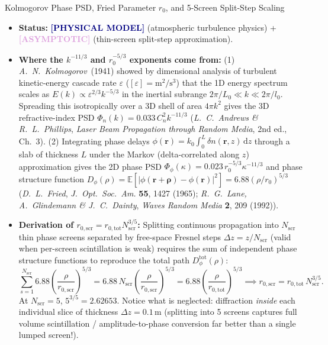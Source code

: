 \documentclass[10pt,letterpaper]{article}
\newcommand{\abs}[1]{\lvert #1 \rvert}
\newcommand{\dd}{\mathrm{d}}
\newcommand{\tagmodel}{\textcolor{navy}{\textbf{[PHYSICAL MODEL]}}}
\newcommand{\tagasymp}{\textcolor{plum}{\textbf{[ASYMPTOTIC]}}}
\numberwithin{equation}{section}
\begin{document}
\begin{approxbox}{Kolmogorov Phase PSD, Fried Parameter $r_0$, and 5-Screen Split-Step Scaling}
\begin{itemize}[leftmargin=1.4em,itemsep=2pt,topsep=1pt]
  \item \textbf{Status:} \tagmodel{} (atmospheric turbulence physics) + \tagasymp{} (thin-screen split-step approximation).
  \item \textbf{Where the $k^{-11/3}$ and $r_0^{-5/3}$ exponents come from:}
    (1) \emph{A.\ N.\ Kolmogorov}~(1941) showed by dimensional analysis of turbulent kinetic-energy cascade rate $\varepsilon$ ($[\varepsilon] = \mathrm{m}^2/\mathrm{s}^3$) that the 1D energy spectrum scales as $E(k) \propto \varepsilon^{2/3} k^{-5/3}$ in the inertial subrange $2\pi/L_0 \ll k \ll 2\pi/l_0$. Spreading this isotropically over a 3D shell of area $4\pi k^2$ gives the 3D refractive-index PSD $\Phi_n(k) = 0.033\,C_n^2 k^{-11/3}$ (\emph{L.\ C.\ Andrews \& R.\ L.\ Phillips}, \emph{Laser Beam Propagation through Random Media}, 2nd ed., Ch.~3).
    (2) Integrating phase delays $\phi(\mathbf{r}) = k_0 \int_0^L \delta n(\mathbf{r},z)\,\dd z$ through a slab of thickness $L$ under the Markov (delta-correlated along $z$) approximation gives the 2D phase PSD $\Phi_\phi(\kappa) = 0.023\,r_0^{-5/3}\kappa^{-11/3}$ and phase structure function $D_\phi(\rho) = \mathbb{E}[\abs{\phi(\mathbf{r}+\boldsymbol{\rho})-\phi(\mathbf{r})}^2] = 6.88(\rho/r_0)^{5/3}$ (\emph{D.\ L.\ Fried}, \emph{J.\ Opt.\ Soc.\ Am.} \textbf{55}, 1427 (1965); \emph{R.\ G.\ Lane, A.\ Glindemann \& J.\ C.\ Dainty}, \emph{Waves Random Media} \textbf{2}, 209 (1992)).
  \item \textbf{Derivation of $r_{0,\mathrm{scr}} = r_{0,\mathrm{tot}} N_{\mathrm{scr}}^{3/5}$:} Splitting continuous propagation into $N_{\mathrm{scr}}$ thin phase screens separated by free-space Fresnel steps $\Delta z = z/N_{\mathrm{scr}}$ (valid when per-screen scintillation is weak) requires the sum of independent phase structure functions to reproduce the total path $D_\phi^{\mathrm{tot}}(\rho)$:
  \[
    \sum_{s=1}^{N_{\mathrm{scr}}} 6.88\left(\frac{\rho}{r_{0,\mathrm{scr}}}\right)^{5/3} = 6.88\,N_{\mathrm{scr}}\left(\frac{\rho}{r_{0,\mathrm{scr}}}\right)^{5/3} = 6.88\left(\frac{\rho}{r_{0,\mathrm{tot}}}\right)^{5/3} \implies r_{0,\mathrm{scr}} = r_{0,\mathrm{tot}}\,N_{\mathrm{scr}}^{3/5}.
  \]
  At $N_{\mathrm{scr}} = 5$, $5^{3/5} = 2.62653$. Notice what is neglected: diffraction \emph{inside} each individual slice of thickness $\Delta z = 0.1\,\mathrm{m}$ (splitting into 5 screens captures full volume scintillation / amplitude-to-phase conversion far better than a single lumped screen!).
\end{itemize}
\end{approxbox}
\end{document}
